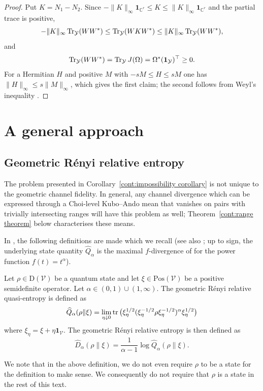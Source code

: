 \begin{proof}
Put $K=N_1-N_2$. Since $-\|K\|_\infty\mathbf{1}_{\mathbb{C}^r}\leq K\leq\|K\|_\infty\mathbf{1}_{\mathbb{C}^r}$ and the partial trace is positive,
\[
-\|K\|_\infty\operatorname{Tr}_{\mathcal{Y}}(WW^*)\leq\operatorname{Tr}_{\mathcal{Y}}(WKW^*)\leq\|K\|_\infty\operatorname{Tr}_{\mathcal{Y}}(WW^*),
\]
and
\[
\operatorname{Tr}_{\mathcal{Y}}(WW^*)=\operatorname{Tr}_{\mathcal{Y}}J(\Omega)=\Omega^*(\mathbf{1}_{\mathcal{Y}})^\top\geq0.
\]
For a Hermitian $H$ and positive $M$ with $-sM\leq H\leq sM$ one has $\|H\|_\infty\leq s\|M\|_\infty$, which gives the first claim; the second follows from Weyl's inequality \cite[Section~III.2]{bhatia1997matrix}.
\end{proof}
\section{A general approach}\label{cont:sec:general}
\subsection{Geometric R\'enyi relative entropy}
The problem presented in Corollary~\ref{cont:impossibility corollary} is not unique to the geometric channel fidelity. In general, any channel divergence which can be expressed through a Choi-level Kubo--Ando mean that vanishes on pairs with trivially intersecting ranges will have this problem as well; Theorem~\ref{cont:range theorem} below characterises these means.
 
In \cite{KatariyaWilde2021}, the following definitions are made which we recall (see also \cite{FangFawzi2021}; up to sign, the underlying state quantity $\widehat{Q}_\alpha$ is the maximal $f$-divergence of \cite{Matsumoto2018newf} for the power function $f(t)=t^\alpha$). 
\begin{definition}
Let $\rho\in \mathrm{D}(\mathcal{V})$ be a quantum state and let $\xi\in\mathrm{Pos}(\mathcal{V})$ be a positive semidefinite operator. Let $\alpha\in (0,1)\cup(1,\infty)$. The geometric R\'enyi relative quasi-entropy is defined as 
\[
    \widehat{Q}_\alpha(\rho\|\xi)=\lim_{\eta\downarrow0}\operatorname{tr}\big(\xi_\eta^{1/2}(\xi_\eta^{-1/2}\rho\xi_\eta^{-1/2})^\alpha\xi_\eta^{1/2}\big)
\]
where $\xi_\eta=\xi+\eta \mathbf{1}_{\mathcal{V}}$. The geometric R\'enyi relative entropy is then defined as
\[
    \widehat{D}_\alpha(\rho\|\xi)=\frac{1}{\alpha-1}\log\widehat{Q}_\alpha(\rho\|\xi).
\]
\end{definition}
We note that in the above definition, we do not even require $\rho$ to be a state for the definition to make sense. We consequently do not require that $\rho$ is a state in the rest of this text.
 
